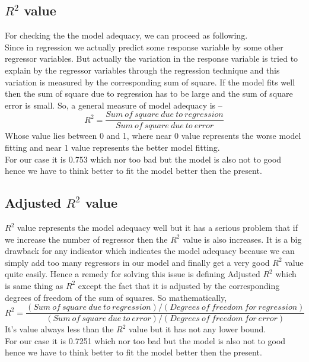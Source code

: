\documentclass[A4paper,11pt]{report}
\begin{document}
	 \subsection{$R^2$ value}
	 \par For checking the the model adequacy, we can proceed as following.\\
	 Since in regression we actually predict some response variable by some other regressor variables. But actually the variation in the response variable is tried to explain by the regressor variables through the regression technique and this variation is measured by the corresponding sum of square. If the model fits well then the sum of square due to regression has to be large and the sum of square error is small. So, a general measure of model adequacy is --
	 $$R^2 = \frac{Sum\ of\ square\ due\ to\ regression}{Sum\ of\ square\ due\ to\ error}$$
	 Whose value lies between 0 and 1, where near 0 value represents the worse model fitting and near 1 value represents the better model fitting.\\
	 For our case it is 0.753 which nor too bad but the model is also not to good hence we have to think better to fit the model better then the present.
	 \subsection{Adjusted $R^2$ value}
	 $R^2$ value represents the model adequacy well but it has a serious problem that if we increase the number of regressor then the $R^2$ value is also increases. It is a big drawback for any indicator which indicates the model adequacy because we can simply add too many regressors in our model and finally get a very good $R^2$ value quite easily. Hence a remedy for solving this issue is defining Adjusted $R^2$ which is same thing as $R^2$ except the fact that it is adjusted by the corresponding degrees of freedom of the sum of squares. So mathematically,
	 $$R^2 = \frac{(Sum\ of\ square\ due\ to\ regression)/(Degrees\ of\ freedom\ for\ regression)}{(Sum\ of\ square\ due\ to\ error)/(Degrees\ of\ freedom\ for\ error)}$$
	 It's value always less than the $R^2$ value but it has not any lower bound.\\
	 For our case it is 0.7251 which nor too bad but the model is also not to good hence we have to think better to fit the model better then the present.
\end{document}

